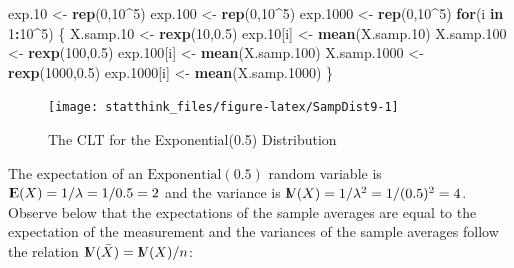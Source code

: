 \documentclass[]{krantz}
\makeatletter
\newenvironment{Shaded}{\begin{snugshade}}{\end{snugshade}}
\newcommand{\KeywordTok}[1]{\textcolor[rgb]{0.13,0.29,0.53}{\textbf{#1}}}
\newcommand{\DecValTok}[1]{\textcolor[rgb]{0.00,0.00,0.81}{#1}}
\newcommand{\FloatTok}[1]{\textcolor[rgb]{0.00,0.00,0.81}{#1}}
\newcommand{\StringTok}[1]{\textcolor[rgb]{0.31,0.60,0.02}{#1}}
\newcommand{\ControlFlowTok}[1]{\textcolor[rgb]{0.13,0.29,0.53}{\textbf{#1}}}
\newcommand{\OperatorTok}[1]{\textcolor[rgb]{0.81,0.36,0.00}{\textbf{#1}}}
\newcommand{\NormalTok}[1]{#1}
\newcommand{\Expec}{{\rm I\kern-.3em E}}
\newcommand{\Var}{{\rm I\kern-.3em V}}
\newenvironment{kframe}{%
\medskip{}
\setlength{\fboxsep}{.8em}
 \def\at@end@of@kframe{}%
 \ifinner\ifhmode%
  \def\at@end@of@kframe{\end{minipage}}%
  \begin{minipage}{\columnwidth}%
 \fi\fi%
 \def\FrameCommand##1{\hskip\@totalleftmargin \hskip-\fboxsep
 \colorbox{shadecolor}{##1}\hskip-\fboxsep
     \hskip-\linewidth \hskip-\@totalleftmargin \hskip\columnwidth}%
 \MakeFramed {\advance\hsize-\width
   \@totalleftmargin\z@ \linewidth\hsize
   \@setminipage}}%
 {\par\unskip\endMakeFramed%
 \at@end@of@kframe}
\renewenvironment{Shaded}{\begin{kframe}}{\end{kframe}}
\theoremstyle{definition}
\theoremstyle{definition}
\theoremstyle{definition}
\theoremstyle{remark}
\makeatother
\begin{document}
\begin{Shaded}
\begin{Highlighting}[]
\NormalTok{exp.}\DecValTok{10}\NormalTok{ <-}\StringTok{ }\KeywordTok{rep}\NormalTok{(}\DecValTok{0}\NormalTok{,}\DecValTok{10}\OperatorTok{^}\DecValTok{5}\NormalTok{)}
\NormalTok{exp.}\DecValTok{100}\NormalTok{ <-}\StringTok{ }\KeywordTok{rep}\NormalTok{(}\DecValTok{0}\NormalTok{,}\DecValTok{10}\OperatorTok{^}\DecValTok{5}\NormalTok{)}
\NormalTok{exp.}\DecValTok{1000}\NormalTok{ <-}\StringTok{ }\KeywordTok{rep}\NormalTok{(}\DecValTok{0}\NormalTok{,}\DecValTok{10}\OperatorTok{^}\DecValTok{5}\NormalTok{)}
\ControlFlowTok{for}\NormalTok{(i }\ControlFlowTok{in} \DecValTok{1}\OperatorTok{:}\DecValTok{10}\OperatorTok{^}\DecValTok{5}\NormalTok{) \{}
\NormalTok{  X.samp.}\DecValTok{10}\NormalTok{ <-}\StringTok{ }\KeywordTok{rexp}\NormalTok{(}\DecValTok{10}\NormalTok{,}\FloatTok{0.5}\NormalTok{)}
\NormalTok{  exp.}\DecValTok{10}\NormalTok{[i] <-}\StringTok{ }\KeywordTok{mean}\NormalTok{(X.samp.}\DecValTok{10}\NormalTok{)}
\NormalTok{  X.samp.}\DecValTok{100}\NormalTok{ <-}\StringTok{ }\KeywordTok{rexp}\NormalTok{(}\DecValTok{100}\NormalTok{,}\FloatTok{0.5}\NormalTok{)}
\NormalTok{  exp.}\DecValTok{100}\NormalTok{[i] <-}\StringTok{ }\KeywordTok{mean}\NormalTok{(X.samp.}\DecValTok{100}\NormalTok{)}
\NormalTok{  X.samp.}\DecValTok{1000}\NormalTok{ <-}\StringTok{ }\KeywordTok{rexp}\NormalTok{(}\DecValTok{1000}\NormalTok{,}\FloatTok{0.5}\NormalTok{)}
\NormalTok{  exp.}\DecValTok{1000}\NormalTok{[i] <-}\StringTok{ }\KeywordTok{mean}\NormalTok{(X.samp.}\DecValTok{1000}\NormalTok{)}
\NormalTok{\}}
\end{Highlighting}
\end{Shaded}

\begin{figure}

{\centering \texttt{[image: statthink\_files/figure-latex/SampDist9-1]} 

}

\caption{The CLT for the Exponential(0.5) Distribution}\label{fig:SampDist9}
\end{figure}

The expectation of an \(\mathrm{Exponential}(0.5)\) random variable is
\(\Expec(X) = 1/\lambda = 1/0.5 = 2\) and the variance is
\(\Var(X) = 1/\lambda^2 = 1/(0.5)^2 = 4\). Observe below that the
expectations of the sample averages are equal to the expectation of the
measurement and the variances of the sample averages follow the relation
\(\Var(\bar X) = \Var (X)/n\):
\end{document}
